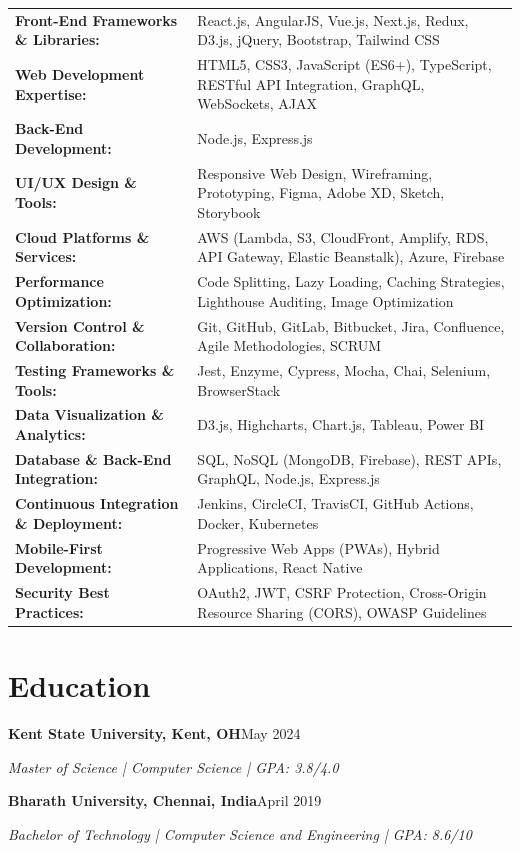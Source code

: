 \documentclass[11pt,a4paper]{article}
\newcommand{\headingBf}[2]{%
  \textbf{#1}\hfill #2\par
}
\newcommand{\headingIt}[2]{%
  \textit{#1}\hfill #2\par
}
\begin{document}
\begin{tabular}{@{}p{6cm} p{9cm}@{}}
\textbf{Front-End Frameworks \& Libraries:} & React.js, AngularJS, Vue.js, Next.js, Redux, D3.js, jQuery, Bootstrap, Tailwind CSS \\
\textbf{Web Development Expertise:} & HTML5, CSS3, JavaScript (ES6+), TypeScript, RESTful API Integration, GraphQL, WebSockets, AJAX \\
\textbf{Back-End Development:} & Node.js, Express.js \\
\textbf{UI/UX Design \& Tools:} & Responsive Web Design, Wireframing, Prototyping, Figma, Adobe XD, Sketch, Storybook \\
\textbf{Cloud Platforms \& Services:} & AWS (Lambda, S3, CloudFront, Amplify, RDS, API Gateway, Elastic Beanstalk), Azure, Firebase \\
\textbf{Performance Optimization:} & Code Splitting, Lazy Loading, Caching Strategies, Lighthouse Auditing, Image Optimization \\
\textbf{Version Control \& Collaboration:} & Git, GitHub, GitLab, Bitbucket, Jira, Confluence, Agile Methodologies, SCRUM \\
\textbf{Testing Frameworks \& Tools:} & Jest, Enzyme, Cypress, Mocha, Chai, Selenium, BrowserStack \\
\textbf{Data Visualization \& Analytics:} & D3.js, Highcharts, Chart.js, Tableau, Power BI \\
\textbf{Database \& Back-End Integration:} & SQL, NoSQL (MongoDB, Firebase), REST APIs, GraphQL, Node.js, Express.js \\
\textbf{Continuous Integration \& Deployment:} & Jenkins, CircleCI, TravisCI, GitHub Actions, Docker, Kubernetes \\
\textbf{Mobile-First Development:} & Progressive Web Apps (PWAs), Hybrid Applications, React Native \\
\textbf{Security Best Practices:} & OAuth2, JWT, CSRF Protection, Cross-Origin Resource Sharing (CORS), OWASP Guidelines \\
\end{tabular}

\section*{Education}

\headingBf{Kent State University, Kent, OH}{May 2024}
\headingIt{Master of Science | Computer Science | GPA: 3.8/4.0}{}

\headingBf{Bharath University, Chennai, India}{April 2019}
\headingIt{Bachelor of Technology | Computer Science and Engineering | GPA: 8.6/10}{}
\end{document}
